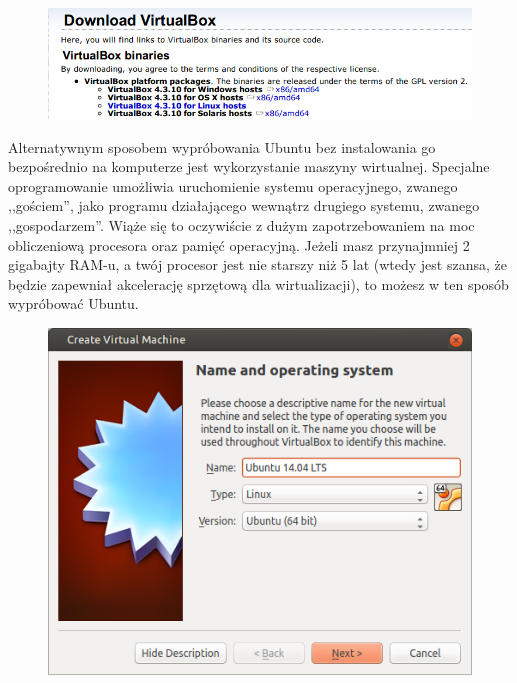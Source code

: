 \begin{figure}
	\vspace{-10pt}
	\includegraphics[width=\linewidth]{images/virtualbox_download.png}
\end{figure}

Alternatywnym sposobem wypróbowania Ubuntu bez instalowania go bezpośrednio na komputerze jest wykorzystanie maszyny wirtualnej. Specjalne oprogramowanie umożliwia uruchomienie systemu operacyjnego, zwanego ,,gościem'', jako programu działającego wewnątrz drugiego systemu, zwanego ,,gospodarzem''. Wiąże się to oczywiście z dużym zapotrzebowaniem na moc obliczeniową procesora oraz pamięć operacyjną. Jeżeli masz przynajmniej 2 gigabajty RAM-u, a twój procesor jest nie starszy niż 5 lat (wtedy jest szansa, że będzie zapewniał akcelerację sprzętową dla wirtualizacji), to możesz w ten sposób wypróbować Ubuntu.

\begin{figure}
	\vspace{-10pt}
	\includegraphics[width=\linewidth]{images/virtualbox_wizard1.png}
\end{figure}

